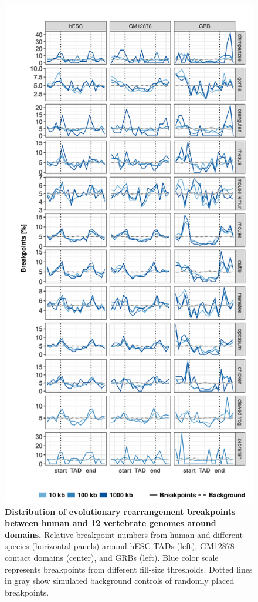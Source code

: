 \documentclass[a4paper,twoside=true,openright,parskip=full,chapterprefix=true,11pt,headings=normal,bibliography=totoc,listof=totoc,titlepage=on,captions=tableabove,draft=false]{scrreprt}
\theoremstyle{definition}
\theoremstyle{definition}
\theoremstyle{definition}
\theoremstyle{remark}
\begin{document}
\begin{figure}

{\centering \includegraphics[width=0.8\linewidth]{figures/TAD_evolution/fig_S1_v01} 

}

\caption{\textbf{Distribution of evolutionary rearrangement
breakpoints between human and 12 vertebrate genomes around domains.}
Relative breakpoint numbers from human and different species (horizontal
panels) around hESC TADs (left), GM12878 contact domains (center), and
GRBs (left). Blue color scale represents breakpoints from different
fill-size thresholds. Dotted lines in gray show simulated background
controls of randomly placed breakpoints.}\label{fig:TadEvoS1}
\end{figure}
\end{document}
